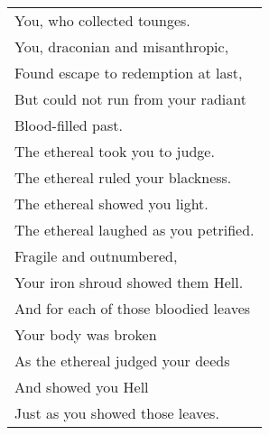 \documentclass{article}
\begin{document}
\begin{center}
\begin{tabular}{l}
You, who collected tounges. \\
You, draconian and misanthropic, \\
Found escape to redemption at last, \\
But could not run from your radiant \\
Blood-filled past. \\
The ethereal took you to judge. \\
The ethereal ruled your blackness. \\
The ethereal showed you light. \\
The ethereal laughed as you petrified. \\
Fragile and outnumbered, \\
Your iron shroud showed them Hell. \\
And for each of those bloodied leaves \\
Your body was broken \\
As the ethereal judged your deeds \\
And showed you Hell \\
Just as you showed those leaves.\\
\end{tabular}
\end{center}

\newpage
\end{document}
